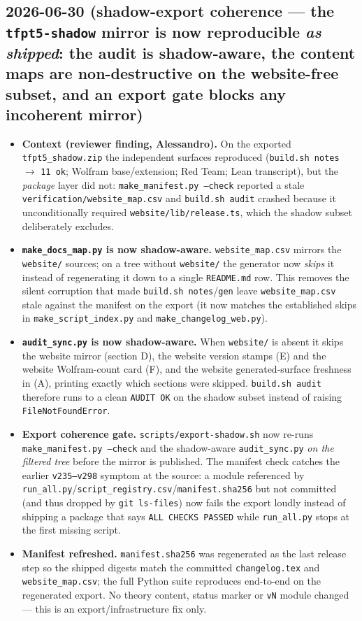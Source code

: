 \documentclass[11pt]{article}
\begin{document}
\subsection*{2026-06-30 (shadow-export coherence --- the \texttt{tfpt5-shadow} mirror is now reproducible \emph{as shipped}: the audit is shadow-aware, the content maps are non-destructive on the website-free subset, and an export gate blocks any incoherent mirror)}
\begin{itemize}
\item \textbf{Context (reviewer finding, Alessandro).} On the exported \texttt{tfpt5\_shadow.zip}
the independent surfaces reproduced (\texttt{build.sh notes} \(\to\) \texttt{11 ok}; Wolfram base/extension;
Red Team; Lean transcript), but the \emph{package} layer did not: \texttt{make\_manifest.py --check}
reported a stale \texttt{verification/website\_map.csv} and \texttt{build.sh audit} crashed because it
unconditionally required \texttt{website/lib/release.ts}, which the shadow subset deliberately excludes.
\item \textbf{\texttt{make\_docs\_map.py} is now shadow-aware.} \texttt{website\_map.csv} mirrors the
\texttt{website/} sources; on a tree without \texttt{website/} the generator now \emph{skips} it instead of
regenerating it down to a single \texttt{README.md} row. This removes the silent corruption that made
\texttt{build.sh notes}/\texttt{gen} leave \texttt{website\_map.csv} stale against the manifest on the export
(it now matches the established skips in \texttt{make\_script\_index.py} and \texttt{make\_changelog\_web.py}).
\item \textbf{\texttt{audit\_sync.py} is now shadow-aware.} When \texttt{website/} is absent it skips the
website mirror (section D), the website version stamps (E) and the website Wolfram-count card (F), and the
website generated-surface freshness in (A), printing exactly which sections were skipped. \texttt{build.sh audit}
therefore runs to a clean \texttt{AUDIT OK} on the shadow subset instead of raising \texttt{FileNotFoundError}.
\item \textbf{Export coherence gate.} \texttt{scripts/export-shadow.sh} now re-runs
\texttt{make\_manifest.py --check} and the shadow-aware \texttt{audit\_sync.py} \emph{on the filtered tree}
before the mirror is published. The manifest check catches the earlier \texttt{v235--v298} symptom at the
source: a module referenced by \texttt{run\_all.py}/\texttt{script\_registry.csv}/\texttt{manifest.sha256} but
not committed (and thus dropped by \texttt{git ls-files}) now fails the export loudly instead of shipping a
package that says \texttt{ALL CHECKS PASSED} while \texttt{run\_all.py} stops at the first missing script.
\item \textbf{Manifest refreshed.} \texttt{manifest.sha256} was regenerated as the last release step so the
shipped digests match the committed \texttt{changelog.tex} and \texttt{website\_map.csv}; the full Python
suite reproduces end-to-end on the regenerated export. No theory content, status marker or \texttt{vN} module
changed --- this is an export/infrastructure fix only.
\end{itemize}
\end{document}
